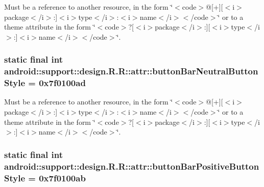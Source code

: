 Must be a reference to another resource, in the form \char`\"{}$<$code$>$@\mbox{[}+\mbox{]}\mbox{[}$<$i$>$package$<$/i$>$:\mbox{]}$<$i$>$type$<$/i$>$:$<$i$>$name$<$/i$>$$<$/code$>$\char`\"{} or to a theme attribute in the form \char`\"{}$<$code$>$?\mbox{[}$<$i$>$package$<$/i$>$:\mbox{]}\mbox{[}$<$i$>$type$<$/i$>$:\mbox{]}$<$i$>$name$<$/i$>$$<$/code$>$\char`\"{}. \hypertarget{classandroid_1_1support_1_1design_1_1_r_1_1attr_43cce39addc2961f8855dd983593429d}{
\subsubsection[{buttonBarNeutralButtonStyle}]{\setlength{\rightskip}{0pt plus 5cm}static final int android::support::design.R.R::attr::buttonBarNeutralButtonStyle = 0x7f0100ad}}
\label{classandroid_1_1support_1_1design_1_1_r_1_1attr_43cce39addc2961f8855dd983593429d}


Must be a reference to another resource, in the form \char`\"{}$<$code$>$@\mbox{[}+\mbox{]}\mbox{[}$<$i$>$package$<$/i$>$:\mbox{]}$<$i$>$type$<$/i$>$:$<$i$>$name$<$/i$>$$<$/code$>$\char`\"{} or to a theme attribute in the form \char`\"{}$<$code$>$?\mbox{[}$<$i$>$package$<$/i$>$:\mbox{]}\mbox{[}$<$i$>$type$<$/i$>$:\mbox{]}$<$i$>$name$<$/i$>$$<$/code$>$\char`\"{}. \hypertarget{classandroid_1_1support_1_1design_1_1_r_1_1attr_30f3a482a5a3e7cd01b95dd5ddcd635b}{
\subsubsection[{buttonBarPositiveButtonStyle}]{\setlength{\rightskip}{0pt plus 5cm}static final int android::support::design.R.R::attr::buttonBarPositiveButtonStyle = 0x7f0100ab}}
\label{classandroid_1_1support_1_1design_1_1_r_1_1attr_30f3a482a5a3e7cd01b95dd5ddcd635b}


